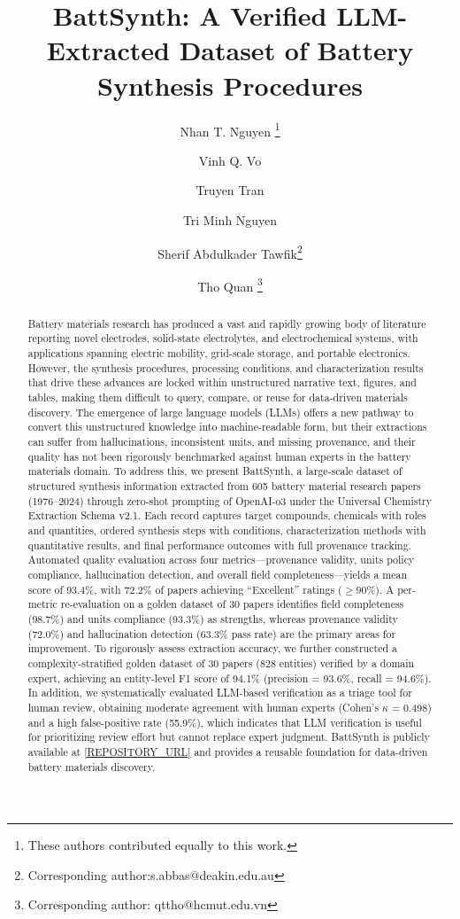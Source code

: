 \documentclass[12pt,a4paper]{article}
\title{BattSynth: A Verified LLM-Extracted Dataset of Battery Synthesis Procedures}
\author[1]{Nhan T. Nguyen%
\thanks{These authors contributed equally to this work.}}
\author[1]{Vinh Q. Vo%
\protect\footnotemark[1]}
\author[2]{Truyen Tran}
\author[2]{Tri Minh Nguyen}
\author[2]{Sherif Abdulkader Tawfik\thanks{Corresponding author:s.abbas@deakin.edu.au}}
\author[1]{Tho Quan
\thanks{Corresponding author: qttho@hcmut.edu.vn}}
\affil[1]{URA Research Group, Ho Chi Minh City University of Technology (HCMUT), Vietnam National University Ho Chi Minh City (VNU-HCM), Vietnam}
\affil[2]{Applied Artificial Intelligence Initiative, Deakin University, Victoria 3216, Australia}
\affil[3]{Smart Green Transformation Center, VinUniversity, Hanoi, Vietnam}
\date{}
\begin{document}
\maketitle

\begin{abstract}
Battery materials research has produced a vast and rapidly growing body of literature reporting novel electrodes, solid-state electrolytes, and electrochemical systems, with applications spanning electric mobility, grid-scale storage, and portable electronics. However, the synthesis procedures, processing conditions, and characterization results that drive these advances are locked within unstructured narrative text, figures, and tables, making them difficult to query, compare, or reuse for data-driven materials discovery. The emergence of large language models (LLMs) offers a new pathway to convert this unstructured knowledge into machine-readable form, but their extractions can suffer from hallucinations, inconsistent units, and missing provenance, and their quality has not been rigorously benchmarked against human experts in the battery materials domain. To address this, we present BattSynth, a large-scale dataset of structured synthesis information extracted from 605 battery material research papers (1976--2024) through zero-shot prompting of OpenAI-o3 under the Universal Chemistry Extraction Schema v2.1. Each record captures target compounds, chemicals with roles and quantities, ordered synthesis steps with conditions, characterization methods with quantitative results, and final performance outcomes with full provenance tracking. Automated quality evaluation across four metrics---provenance validity, units policy compliance, hallucination detection, and overall field completeness---yields a mean score of 93.4\%, with 72.2\% of papers achieving ``Excellent'' ratings ($\geq$90\%). A per-metric re-evaluation on a golden dataset of 30 papers identifies field completeness (98.7\%) and units compliance (93.3\%) as strengths, whereas provenance validity (72.0\%) and hallucination detection (63.3\% pass rate) are the primary areas for improvement. To rigorously assess extraction accuracy, we further constructed a complexity-stratified golden dataset of 30 papers (828 entities) verified by a domain expert, achieving an entity-level F1 score of 94.1\% (precision = 93.6\%, recall = 94.6\%). In addition, we systematically evaluated LLM-based verification as a triage tool for human review, obtaining moderate agreement with human experts (Cohen's $\kappa$ = 0.498) and a high false-positive rate (55.9\%), which indicates that LLM verification is useful for prioritizing review effort but cannot replace expert judgment. BattSynth is publicly available at \url{[REPOSITORY_URL]} and provides a reusable foundation for data-driven battery materials discovery.
\end{abstract}
\end{document}
